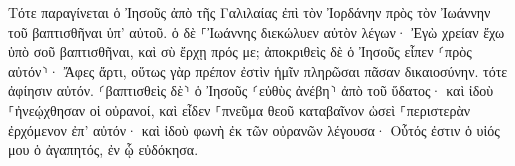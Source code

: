 \documentclass{openreader}
\begin{document}
Τότε παραγίνεται ὁ Ἰησοῦς ἀπὸ τῆς Γαλιλαίας ἐπὶ τὸν Ἰορδάνην πρὸς τὸν Ἰωάννην τοῦ βαπτισθῆναι ὑπ’ αὐτοῦ. 
ὁ δὲ ⸀Ἰωάννης διεκώλυεν αὐτὸν λέγων· Ἐγὼ χρείαν ἔχω ὑπὸ σοῦ βαπτισθῆναι, καὶ σὺ ἔρχῃ πρός με; 
ἀποκριθεὶς δὲ ὁ Ἰησοῦς εἶπεν ⸂πρὸς αὐτόν⸃· Ἄφες ἄρτι, οὕτως γὰρ πρέπον ἐστὶν ἡμῖν πληρῶσαι πᾶσαν δικαιοσύνην. τότε ἀφίησιν αὐτόν. 
⸂βαπτισθεὶς δὲ⸃ ὁ Ἰησοῦς ⸂εὐθὺς ἀνέβη⸃ ἀπὸ τοῦ ὕδατος· καὶ ἰδοὺ ⸀ἠνεῴχθησαν οἱ οὐρανοί, καὶ εἶδεν ⸀πνεῦμα θεοῦ καταβαῖνον ὡσεὶ ⸀περιστερὰν ἐρχόμενον ἐπ’ αὐτόν· 
καὶ ἰδοὺ φωνὴ ἐκ τῶν οὐρανῶν λέγουσα· Οὗτός ἐστιν ὁ υἱός μου ὁ ἀγαπητός, ἐν ᾧ εὐδόκησα. 
\end{document}
